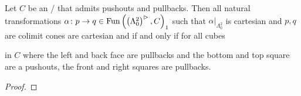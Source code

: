 \begin{lemma}\label{lem:descForPushouts}
    Let $C$ be an \inftycat/ that admits pushouts and pullbacks.
    Then all natural transformations $\alpha\colon p\to q\in\operatorname{Fun}\left(\left(\Lambda^2_0\right)^{\rhd},C\right)_1$ such that $\alpha|_{\Lambda^2_0}$ is cartesian and $p,q$ are colimit cones are cartesian and if and only if for all cubes
    \begin{center}
    \end{center}
    in $C$ where the left and back face are pullbacks and the bottom and top square are a pushouts, the front and right squares are pullbacks.
    \begin{proof}
    \end{proof}
\end{lemma}
